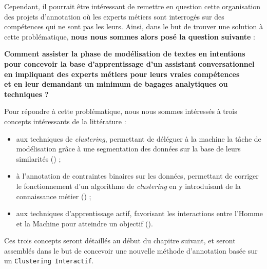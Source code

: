 	
	Cependant, il pourrait être intéressant de remettre en question cette organisation des projets d'annotation où les experts métiers sont interrogés sur des compétences qui ne sont pas les leurs.
	Ainsi, dans le but de trouver une solution à cette problématique, \textbf{nous nous sommes alors posé la question suivante} :
	\begin{leftBarImportantGreen}
		\begin{center}
		\textbf{
			Comment assister la phase de modélisation de textes en intentions \\
			pour concevoir la base d'apprentissage d'un assistant conversationnel \\
			en impliquant des experts métiers pour leurs vraies compétences \\
			et en leur demandant un minimum de bagages analytiques ou techniques ?
		}
		\end{center}
	\end{leftBarImportantGreen}
	
	
	\begin{leftBarIdea}
		Pour répondre à cette problématique, nous nous sommes intéressés à trois concepts intéressants de la littérature :
		\begin{itemize}
			\item aux techniques de \textit{clustering}, permettant de déléguer à la machine la tâche de modélisation grâce à une segmentation des données sur la base de leurs similarités (\cite{xu-tian:2015:comprehensive-survey-clustering}) ;
			\item à l'annotation de contraintes binaires sur les données, permettant de corriger le fonctionnement d'un algorithme de \textit{clustering} en y introduisant de la connaissance métier (\cite{lampert-etal:2018:constrained-distance-based}) ;
			\item aux techniques d'apprentissage actif, favorisant les interactions entre l'Homme et la Machine pour atteindre un objectif (\cite{settles:2010:active-learning-literature}).
		\end{itemize}
		Ces trois concepts seront détaillés au début du chapitre suivant, et seront assemblés dans le but de concevoir une nouvelle méthode d'annotation basée sur un \texttt{Clustering Interactif}.
	\end{leftBarIdea}
